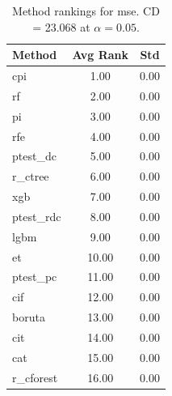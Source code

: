 \begin{table}[h]
\centering
\caption{Method rankings for mse. CD = 23.068 at $\alpha=0.05$.}
\label{tab:ranks_mse}
\begin{tabular}{lcc}
\toprule
Method & Avg Rank & Std \\
\midrule
cpi & 1.00 & 0.00 \\
rf & 2.00 & 0.00 \\
pi & 3.00 & 0.00 \\
rfe & 4.00 & 0.00 \\
ptest_dc & 5.00 & 0.00 \\
r_ctree & 6.00 & 0.00 \\
xgb & 7.00 & 0.00 \\
ptest_rdc & 8.00 & 0.00 \\
lgbm & 9.00 & 0.00 \\
et & 10.00 & 0.00 \\
ptest_pc & 11.00 & 0.00 \\
cif & 12.00 & 0.00 \\
boruta & 13.00 & 0.00 \\
cit & 14.00 & 0.00 \\
cat & 15.00 & 0.00 \\
r_cforest & 16.00 & 0.00 \\
\bottomrule
\end{tabular}
\end{table}